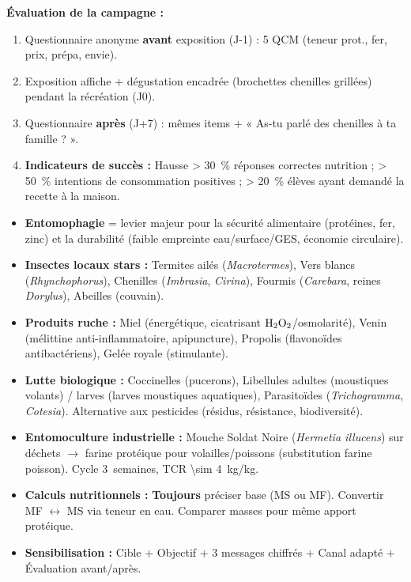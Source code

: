 \documentclass[11pt]{article}
\newcounter{popsec}
\newcounter{popsub}
\newcommand{\courssub}[1]{%
  \stepcounter{popsub}%
  \par\vspace{9pt}\noindent{\popxbold\fontsize{11.5}{13}\selectfont\color{popink}{\color{poporange}\thepopsec.\thepopsub}\hspace{6pt}#1}\par\nopagebreak\vspace{4pt}
}
\begin{document}
\begin{exoresolu}
\textbf{Évaluation de la campagne :}
\begin{enumerate}
\item Questionnaire anonyme \textbf{avant} exposition (J-1) : 5 QCM (teneur prot., fer, prix, prépa, envie).
\item Exposition affiche + dégustation encadrée (brochettes chenilles grillées) pendant la récréation (J0).
\item Questionnaire \textbf{après} (J+7) : mêmes items + « As-tu parlé des chenilles à ta famille ? ».
\item \textbf{Indicateurs de succès :} Hausse \SI{> 30}{\percent} réponses correctes nutrition ; \SI{> 50}{\percent} intentions de consommation positives ; \SI{> 20}{\percent} élèves ayant demandé la recette à la maison.
\end{enumerate}
\end{exoresolu}

\courssub{Synthèse et erreurs à éviter}

\begin{aretenir}
\begin{itemize}
\item \textbf{Entomophagie} = levier majeur pour la sécurité alimentaire (protéines, fer, zinc) et la durabilité (faible empreinte eau/surface/GES, économie circulaire).
\item \textbf{Insectes locaux stars :} Termites ailés (\emph{Macrotermes}), Vers blancs (\emph{Rhynchophorus}), Chenilles (\emph{Imbrasia}, \emph{Cirina}), Fourmis (\emph{Carebara}, reines \emph{Dorylus}), Abeilles (couvain).
\item \textbf{Produits ruche :} Miel (énergétique, cicatrisant $\ce{H2O2}$/osmolarité), Venin (mélittine anti-inflammatoire, apipuncture), Propolis (flavonoïdes antibactériens), Gelée royale (stimulante).
\item \textbf{Lutte biologique :} Coccinelles (pucerons), Libellules adultes (moustiques volants) / larves (larves moustiques aquatiques), Parasitoïdes (\emph{Trichogramma}, \emph{Cotesia}). Alternative aux pesticides (résidus, résistance, biodiversité).
\item \textbf{Entomoculture industrielle :} Mouche Soldat Noire (\emph{Hermetia illucens}) sur déchets $\rightarrow$ farine protéique pour volailles/poissons (substitution farine poisson). Cycle \SI{3}{semaines}, TCR \SI{\sim 4}{kg/kg}.
\item \textbf{Calculs nutritionnels :} \textbf{Toujours} préciser base (MS ou MF). Convertir MF $\leftrightarrow$ MS via teneur en eau. Comparer masses pour même apport protéique.
\item \textbf{Sensibilisation :} Cible + Objectif + 3 messages chiffrés + Canal adapté + Évaluation avant/après.
\end{itemize}
\end{aretenir}
\end{document}
